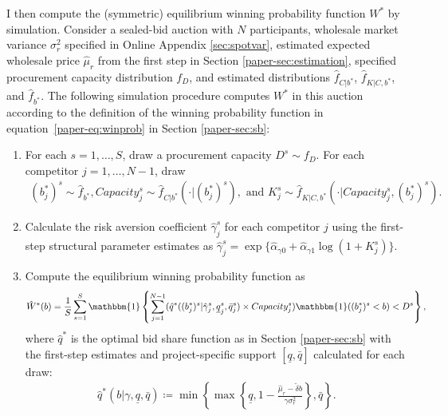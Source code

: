 \documentclass[12pt]{article}
\theoremstyle{definition} %
\newcommand{\I}{\mathbbm{1}}
\begin{document}
I then compute the (symmetric) equilibrium winning probability function $W^\ast $ by simulation. Consider a sealed-bid auction with $N$ participants, wholesale market variance $\sigma_r^2$ specified in Online Appendix \ref{sec:spotvar}, estimated expected wholesale price $\hat{\mu}_{r}$ from the first step in Section \ref{paper-sec:estimation}, specified procurement capacity distribution $f_D$, and estimated distributions $\hat{f}_{C | b^\ast}$, $\hat{f}_{K|C,b^\ast}$, and $\hat{f}_{b^\ast}$. The following simulation procedure computes $W^\ast $ in this auction according to the definition of the winning probability function in equation~\eqref{paper-eq:winprob} in Section \ref{paper-sec:sb}:
\begin{enumerate}

\item
For each $s=1,\dots,S $, draw a procurement capacity $D^s \sim f_D $. For each competitor $j=1,\dots,N-1$, draw
\begin{align*}
(b_j^\ast)^s\sim\hat{f}_{b^\ast},
Capacity_j^s\sim\hat{f}_{C|b^\ast}(\cdot|(b_j^\ast)^s), \text{ and }
K_j^s\sim\hat{f}_{K|C,b^\ast}(\cdot|Capacity_j^s,(b_j^\ast)^s).
\end{align*}

\item
Calculate the risk aversion coefficient $\hat{\gamma}_j^s $ for each competitor $j$ using the first-step structural parameter estimates as $\hat{\gamma}_j^s=\exp\{\hat{\alpha}_{\gamma 0}+\hat{\alpha}_{\gamma 1}\log(1+K_j^s)\}$.

\item
Compute the equilibrium winning probability function as
\begin{align*}
\hat{W}^\ast(b) = \frac{1}{S} \sum_{s=1}^{S} \I \left\{ \sum_{j=1}^{N-1} (\hat{q}^\ast((b_j^\ast)^s | \hat{\gamma}_j^s,\underline{q}_j^s,\bar{q}_j^s) \times Capacity_j^s) \I((b_j^\ast)^s < b) < D^s \right\},
\end{align*}
where $\hat{q}^\ast$ is the optimal bid share function as in Section \ref{paper-sec:sb} with the first-step estimates and project-specific support $[\underline{q},\bar{q}]$ calculated for each draw:
\begin{align}
\label{eq:optqsbhat}
\hat{q}^\ast(b | \gamma,\underline{q},\bar{q}) \coloneqq \min \left\{\max \left\{\underline{q}, 1 - \frac{\hat{\mu}_{r} - \tilde{\delta} b}{\gamma \sigma_r^2} \right\}, \bar{q} \right\}.
\end{align}

\end{enumerate}
\end{document}
